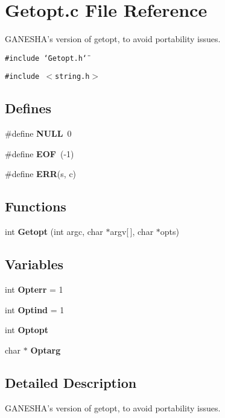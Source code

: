 \section{Getopt.c File Reference}
\label{Getopt_8c}
GANESHA's version of getopt, to avoid portability issues. 

{\tt \#include \char`\"{}Getopt.h\char`\"{}}\par
{\tt \#include $<$string.h$>$}\par
\subsection*{Defines}
\begin{CompactItemize}
\item 
\#define {\bf NULL}\ 0
\item 
\#define {\bf EOF}\ (-1)
\item 
\#define {\bf ERR}(s, c)
\end{CompactItemize}
\subsection*{Functions}
\begin{CompactItemize}
\item 
int {\bf Getopt} (int argc, char $\ast$argv[$\,$], char $\ast$opts)
\end{CompactItemize}
\subsection*{Variables}
\begin{CompactItemize}
\item 
int {\bf Opterr} = 1
\item 
int {\bf Optind} = 1
\item 
int {\bf Optopt}
\item 
char $\ast$ {\bf Optarg}
\end{CompactItemize}


\subsection{Detailed Description}
GANESHA's version of getopt, to avoid portability issues. 

